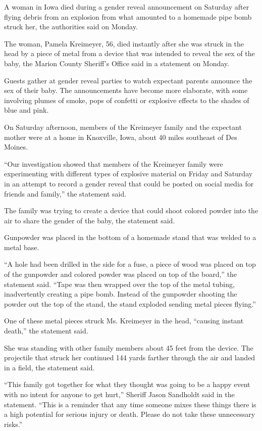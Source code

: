 A woman in Iowa died during a gender reveal announcement on Saturday
after flying debris from an explosion from what amounted to a homemade
pipe bomb struck her, the authorities said on Monday.

The woman, Pamela Kreimeyer, 56, died instantly after she was struck in
the head by a piece of metal from a device that was intended to reveal
the sex of the baby, the Marion County Sheriff's Office said in a
statement on Monday.

Guests gather at gender reveal parties to watch expectant parents
announce the sex of their baby. The announcements have become more
elaborate, with some involving plumes of smoke, pops of confetti or
explosive effects to the shades of blue and pink.

On Saturday afternoon, members of the Kreimeyer family and the expectant
mother were at a home in Knoxville, Iowa, about 40 miles southeast of
Des Moines.

``Our investigation showed that members of the Kreimeyer family were
experimenting with different types of explosive material on Friday and
Saturday in an attempt to record a gender reveal that could be posted on
social media for friends and family,'' the statement said.

The family was trying to create a device that could shoot colored powder
into the air to share the gender of the baby, the statement said.

Gunpowder was placed in the bottom of a homemade stand that was welded
to a metal base.

``A hole had been drilled in the side for a fuse, a piece of wood was
placed on top of the gunpowder and colored powder was placed on top of
the board,'' the statement said. ``Tape was then wrapped over the top of
the metal tubing, inadvertently creating a pipe bomb. Instead of the
gunpowder shooting the powder out the top of the stand, the stand
exploded sending metal pieces flying.''

One of these metal pieces struck Ms. Kreimeyer in the head, ``causing
instant death,'' the statement said.

She was standing with other family members about 45 feet from the
device. The projectile that struck her continued 144 yards farther
through the air and landed in a field, the statement said.

``This family got together for what they thought was going to be a happy
event with no intent for anyone to get hurt,'' Sheriff Jason Sandholdt
said in the statement. ``This is a reminder that any time someone mixes
these things there is a high potential for serious injury or death.
Please do not take these unnecessary risks.''


